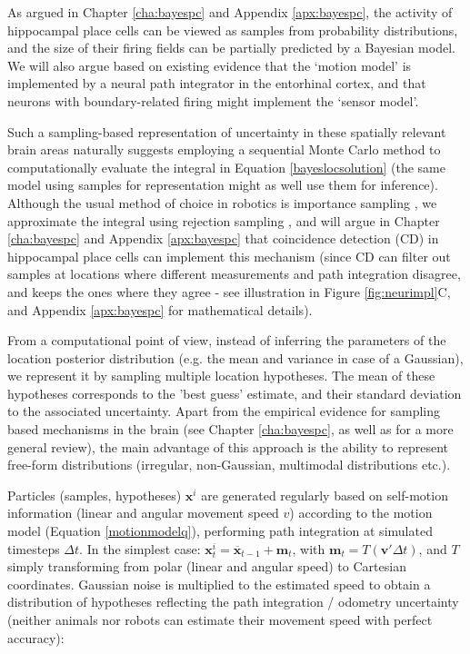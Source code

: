 As argued in Chapter \ref{cha:bayespc} and Appendix \ref{apx:bayespc}, the activity of hippocampal place cells can be viewed as samples from probability distributions, and the size of their firing fields can be partially predicted by a Bayesian model. We will also argue based on existing evidence that the `motion model' is implemented by a neural path integrator in the entorhinal cortex, and that neurons with boundary-related firing might implement the `sensor model'.

Such a sampling-based representation of uncertainty in these spatially relevant brain areas naturally suggests employing a sequential Monte Carlo method \citep{doucet2000sequential} to computationally evaluate the integral in Equation \ref{bayeslocsolution} (the same model using samples for representation might as well use them for inference). Although the usual method of choice in robotics is importance sampling \citep{montemerlo2007fastslam, thrun2005probabilistic}, we approximate the integral using rejection sampling \citep{doucet2000sequential}, and will argue in Chapter \ref{cha:bayespc} and Appendix \ref{apx:bayespc} that coincidence detection (CD) in hippocampal place cells can implement this mechanism (since CD can filter out samples at locations where different measurements and path integration disagree, and keeps the ones where they agree - see illustration in Figure \ref{fig:neurimpl}C, and Appendix \ref{apx:bayespc} for mathematical details). 

From a computational point of view, instead of inferring the parameters of the location posterior distribution (e.g. the mean and variance in case of a Gaussian), we represent it by sampling multiple location hypotheses. The mean of these hypotheses corresponds to the 'best guess' estimate, and their standard deviation to the associated uncertainty. Apart from the empirical evidence for sampling based mechanisms in the brain (see Chapter \ref{cha:bayespc}, as well as \citep{fiser2010statistically} for a more general review), the main advantage of this approach is the ability to represent free-form distributions (irregular, non-Gaussian, multimodal distributions etc.).

Particles (samples, hypotheses) $\bm x^i$ are generated regularly based on self-motion information (linear and angular movement speed $v$) according to the motion model (Equation \ref{motionmodelq}), performing path integration at simulated timesteps $ \Delta t $. In the simplest case: $ \bm x_{t}^i = \overline{\bm x}_{t-1} + \bm m_t $, with $\bm m_t=T(\bm v'\Delta t)$, and $T$ simply transforming from polar (linear and angular speed) to Cartesian coordinates. Gaussian noise is multiplied to the estimated speed to obtain a distribution of hypotheses reflecting the path integration / odometry uncertainty (neither animals nor robots can estimate their movement speed with perfect accuracy):

